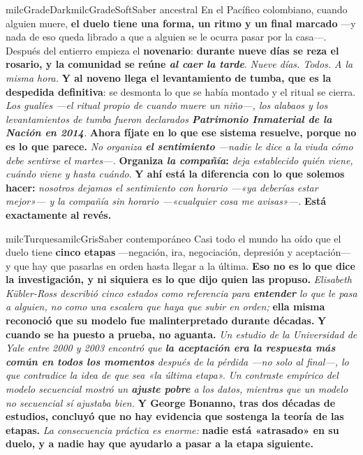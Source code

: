 \documentclass[11pt,letterpaper]{article}
\begin{document}
\begin{softbox}{milcGradeDark}{milcGradeSoft}{Saber ancestral}
En el Pacífico colombiano, cuando alguien muere, \textbf{el duelo tiene una forma, un ritmo y un final marcado} ---y nada de eso queda librado a que a alguien se le ocurra pasar por la casa---. Después del entierro empieza el \textbf{novenario}: \textbf{durante nueve días se reza el rosario, y la comunidad se reúne \emph{al caer la tarde}}. \emph{Nueve días. Todos. A la misma hora.} \textbf{Y al noveno llega el \textbf{levantamiento de tumba}, que es la despedida definitiva}: se desmonta lo que se había montado y el ritual se cierra. \emph{Los gualíes ---el ritual propio de cuando muere un niño---, los alabaos y los levantamientos de tumba fueron declarados \textbf{Patrimonio Inmaterial de la Nación en 2014}.} \textbf{Ahora fíjate en lo que ese sistema resuelve, porque no es lo que parece.} \emph{No organiza \textbf{el sentimiento} ---nadie le dice a la viuda cómo debe sentirse el martes---.} \textbf{Organiza \emph{la compañía}:} \emph{deja establecido quién viene, cuándo viene y hasta cuándo}. \textbf{Y ahí está la diferencia con lo que solemos hacer:} \emph{nosotros dejamos el sentimiento con horario ---«ya deberías estar mejor»--- y la compañía sin horario ---«cualquier cosa me avisas»---.} \textbf{Está exactamente al revés.}
\end{softbox}

\begin{softbox}{milcTurquesa}{milcGris}{Saber contemporáneo}
Casi todo el mundo ha oído que el duelo tiene \textbf{cinco etapas} ---negación, ira, negociación, depresión y aceptación--- y que hay que pasarlas en orden hasta llegar a la última. \textbf{Eso no es lo que dice la investigación, y ni siquiera es lo que dijo quien las propuso.} \emph{Elisabeth Kübler-Ross describió cinco estados como referencia para \textbf{entender} lo que le pasa a alguien, no como una escalera que haya que subir en orden;} \textbf{ella misma reconoció que su modelo fue malinterpretado durante décadas.} \textbf{Y cuando se ha puesto a prueba, no aguanta.} \emph{Un estudio de la Universidad de Yale entre 2000 y 2003 encontró que \textbf{la aceptación era la respuesta más común en todos los momentos} después de la pérdida ---no solo al final---, lo que contradice la idea de que sea «la última etapa».} \emph{Un contraste empírico del modelo secuencial mostró un \textbf{ajuste pobre} a los datos, mientras que un modelo no secuencial sí ajustaba bien.} \textbf{Y George Bonanno, tras dos décadas de estudios, concluyó que no hay evidencia que sostenga la teoría de las etapas.} \emph{La consecuencia práctica es enorme:} \textbf{nadie está «atrasado» en su duelo, y a nadie hay que ayudarlo a pasar a la etapa siguiente.}
\end{softbox}
\end{document}
